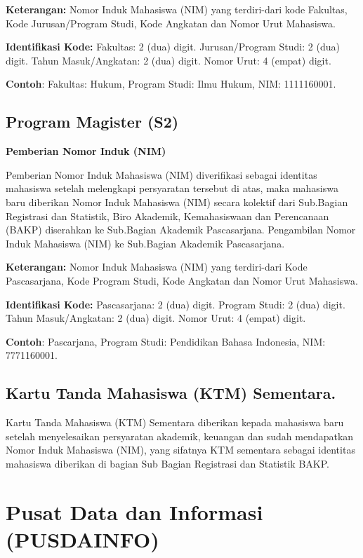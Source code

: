 \documentclass[
]{book}
\begin{document}
\textbf{Keterangan:} Nomor Induk Mahasiswa (NIM) yang terdiri-dari kode Fakultas, Kode Jurusan/Program Studi, Kode Angkatan dan Nomor Urut Mahasiswa.

\textbf{Identifikasi Kode:} Fakultas: 2 (dua) digit. Jurusan/Program Studi: 2 (dua) digit. Tahun Masuk/Angkatan: 2 (dua) digit. Nomor Urut: 4 (empat) digit.

\textbf{Contoh}: Fakultas: Hukum, Program Studi: Ilmu Hukum, NIM: 1111160001.

\hypertarget{program-magister-s2-2}{%
\subsection{Program Magister (S2)}\label{program-magister-s2-2}}

\textbf{Pemberian Nomor Induk (NIM)}

Pemberian Nomor Induk Mahasiswa (NIM) diverifikasi sebagai identitas mahasiswa setelah melengkapi persyaratan tersebut di atas, maka mahasiswa baru diberikan Nomor Induk Mahasiswa (NIM) secara kolektif dari Sub.Bagian Registrasi dan Statistik, Biro Akademik, Kemahasiswaan dan Perencanaan (BAKP) diserahkan ke Sub.Bagian Akademik Pascasarjana. Pengambilan Nomor Induk Mahasiswa (NIM) ke Sub.Bagian Akademik Pascasarjana.

\textbf{Keterangan:} Nomor Induk Mahasiswa (NIM) yang terdiri-dari Kode Pascasarjana, Kode Program Studi, Kode Angkatan dan Nomor Urut Mahasiswa.

\textbf{Identifikasi Kode:} Pascasarjana: 2 (dua) digit. Program Studi: 2 (dua) digit. Tahun Masuk/Angkatan: 2 (dua) digit. Nomor Urut: 4 (empat) digit.

\textbf{Contoh}: Pascarjana, Program Studi: Pendidikan Bahasa Indonesia, NIM: 7771160001.

\hypertarget{kartu-tanda-mahasiswa-ktm-sementara.}{%
\subsection{Kartu Tanda Mahasiswa (KTM) Sementara.}\label{kartu-tanda-mahasiswa-ktm-sementara.}}

Kartu Tanda Mahasiswa (KTM) Sementara diberikan kepada mahasiswa baru setelah menyelesaikan persyaratan akademik, keuangan dan sudah mendapatkan Nomor Induk Mahasiswa (NIM), yang sifatnya KTM sementara sebagai identitas mahasiswa diberikan di bagian Sub Bagian Registrasi dan Statistik BAKP.

\hypertarget{pusat-data-dan-informasi-pusdainfo}{%
\section{Pusat Data dan Informasi (PUSDAINFO)}\label{pusat-data-dan-informasi-pusdainfo}}
\end{document}
